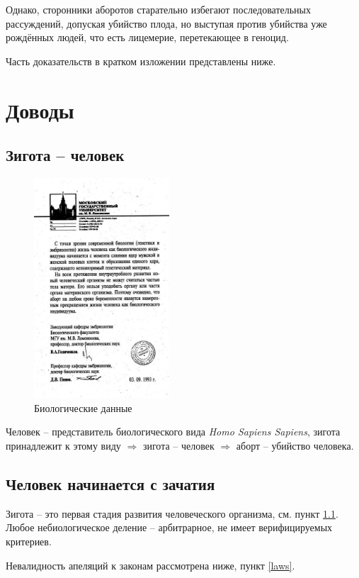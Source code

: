 \documentclass[a4paper,12pt]{report}
\begin{document}
Однако, сторонники аборотов старательно избегают последовательных рассуждений, 
допуская убийство плода, но выступая против убийства уже рождённых людей, что есть лицемерие,
перетекающее в геноцид.

Часть доказательств в кратком изложении представлены ниже. 

\chapter{Доводы}
    \section{Зигота -- человек}\label{ishuman}
        \begin{figure}[!h]
            \centering
            \includegraphics[width=0.45\textwidth]{evidence.jpg}
            \caption{Биологические данные}
        \end{figure}
     
        Человек -- представитель биологического вида \textit{Homo Sapiens Sapiens}, зигота принадлежит к этому виду $\Rightarrow$ зигота -- человек $\Rightarrow$ аборт -- убийство человека.
	\section{Человек начинается с зачатия}
        Зигота -- это первая стадия развития человеческого организма, см. пункт \ref{ishuman}. 
        Любое небиологическое деление -- арбитрарное, не имеет верифицируемых критериев. 

        Невалидность апеляций к законам рассмотрена ниже, пункт \ref{laws}.
\end{document}
